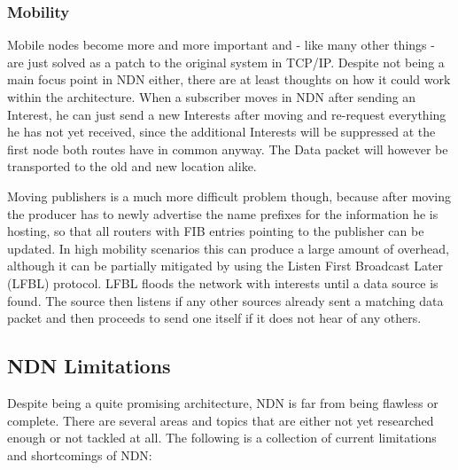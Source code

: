 \subsubsection{Mobility} \label{subsubsection:Mobility}
Mobile nodes become more and more important and - like many other things - are just solved as a patch to the original system in TCP/IP. Despite not being a main focus point in NDN either, there are at least thoughts on how it could work within the architecture. When a subscriber moves in NDN after sending an Interest, he can just send a new Interests after moving and re-request everything he has not yet received, since the additional Interests will be suppressed at the first node both routes have in common anyway. The Data packet will however be transported to the old and new location alike. 

Moving publishers is a much more difficult problem though, because after moving the producer has to newly advertise the name prefixes for the information he is hosting, so that all routers with FIB entries pointing to the publisher can be updated. In high mobility scenarios this can produce a large amount of overhead, although it can be partially mitigated by using the Listen First Broadcast Later (LFBL) protocol. LFBL floods the network with interests until a data source is found. The source then listens if any other sources already sent a matching data packet and then proceeds to send one itself if it does not hear of any others. \cite{ZABJ14}
\subsection{NDN Limitations}


Despite being a quite promising architecture, NDN is far from being flawless or complete. There are several areas and topics that are either not yet researched enough or not tackled at all. The following is a collection of current limitations and shortcomings of NDN:

